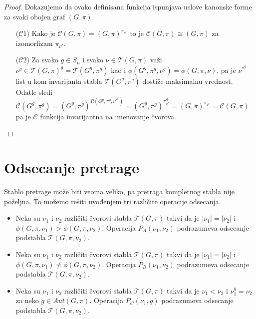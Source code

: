 \documentclass[12pt,oneside]{memoir}
\theoremstyle{definition}
\begin{document}
  \begin{proof}
		Dokazujemo da ovako definisana funkcija ispunjava uslove kanonske forme za
		svaki obojen graf $(G, \pi)$.
	  \begin{itemize}
		  \item [($\mathcal{C}1$)] Kako je $\mathcal{C}(G, \pi) = (G,
			  \pi)^{\pi_{\nu^*}}$ to je $\mathcal{C}(G, \pi) \cong (G, \pi)$ za
			  izomorfizam $\pi_{\nu^*}$.
		  \item [($\mathcal{C}2$)] Za svako $g \in S_n$ i svako $\nu \in
			  \mathcal{T}(G, \pi)$ važi $\nu^g \in \mathcal{T}(G, \pi)^g =
			  \mathcal{T}(G^g, \pi^g)$ kao i $\phi(G^g, \pi^g, \nu^g) = \phi(G,
			  \pi, \nu)$, pa je $\nu^*^g$ list u kom invarijanta stabla
			  $\mathcal{T}(G^g, \pi^g)$ dostiže maksimalnu vrednost.  Odatle
			  sledi $\mathcal{C}(G^g, \pi^g) = (G^g, \pi^g)^{R(G^g, \pi^g,
			  \nu^*^g)} = (G^g, \pi^g)^{\pi_{v^*}^g} = (G, \pi)^{\pi_{v^*}} =
			  \mathcal{C}(G, \pi)$ pa je $\mathcal{C}$ funkcija invarijantna na
			  imenovanje čvorova.
	  \end{itemize}
  \end{proof}

 \section{Odsecanje pretrage}

  Stablo pretrage može biti veoma veliko, pa pretraga kompletnog stabla nije
  poželjna. To možemo rešiti uvođenjem tri različite operacije odsecanja.
  \begin{itemize}
	  \item Neka su $\nu_1$ i $\nu_2$ različiti čvorovi stabla $\mathcal{T}(G,
		  \pi)$ takvi da je $|\nu_1|=|\nu_2|$ i $\phi(G, \pi, \nu_1) >
		  \phi(G, \pi, \nu_2)$. Operacija $P_A(\nu_1, \nu_2)$ podrazumeva
		  odsecanje podstabla $\mathcal{T}(G, \pi, \nu_2)$.
	  \item Neka su $\nu_1$ i $\nu_2$ različiti čvorovi stabla $\mathcal{T}(G,
		  \pi)$ takvi da je $|\nu_1|=|\nu_2|$ i $\phi(G, \pi, \nu_1) \neq
		  \phi(G, \pi, \nu_2)$. Operacija $P_B(\nu_1, \nu_2)$ podrazumeva
		  odsecanje podstabla $\mathcal{T}(G, \pi, \nu_2)$.
	  \item Neka su $\nu_1$ i $\nu_2$ različiti čvorovi stabla $\mathcal{T}(G,
		  \pi)$ takvi da je $\nu_1 < \nu_2$ i $\nu_1^g=\nu_2$ za neko $g \in
		  Aut(G, \pi)$. Operacija $P_C(\nu_1, g)$ podrazumeva odsecanje
		  podstabla $\mathcal{T}(G, \pi, \nu_2)$.
  \end{itemize}
\end{document}
